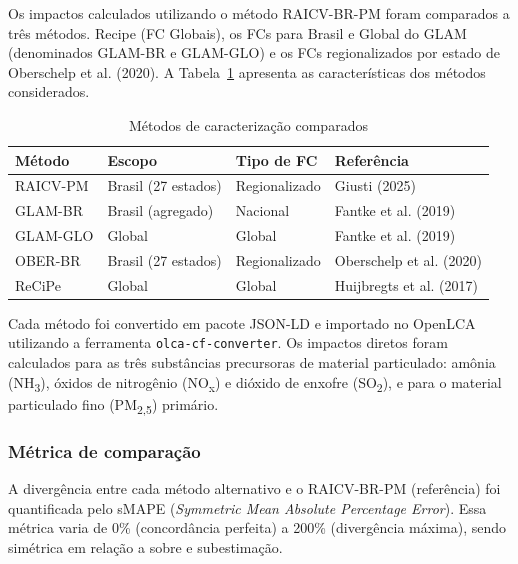 Os impactos calculados utilizando o método RAICV-BR-PM foram comparados a três métodos. Recipe (FC Globais), os FCs para Brasil e Global do GLAM (denominados GLAM-BR e GLAM-GLO) e os FCs regionalizados por estado de Oberschelp et al. (2020). A Tabela~\ref{tab:metodos-comparados} apresenta as características dos métodos considerados.

\begin{table}[H]
\centering
\caption{M\'etodos de caracteriza\c{c}\~ao comparados}
\label{tab:metodos-comparados}
\begin{tabular}{llll}
\toprule
\textbf{M\'etodo} & \textbf{Escopo} & \textbf{Tipo de FC} & \textbf{Refer\^encia} \\
\midrule
RAICV-PM  & Brasil (27 estados) & Regionalizado & Giusti (2025) \\
GLAM-BR   & Brasil (agregado)   & Nacional      & Fantke et al. (2019) \\
GLAM-GLO  & Global              & Global        & Fantke et al. (2019) \\
OBER-BR   & Brasil (27 estados) & Regionalizado & Oberschelp et al. (2020) \\
ReCiPe    & Global              & Global        & Huijbregts et al. (2017) \\
\bottomrule
\end{tabular}
\end{table}

Cada m\'etodo foi convertido em pacote JSON-LD e importado no OpenLCA utilizando a ferramenta \texttt{olca-cf-converter}. Os impactos diretos foram calculados para as três subst\^ancias precursoras de material particulado: am\^onia (NH\textsubscript{3}), \'oxidos de nitrog\^enio (NO\textsubscript{x}) e di\'oxido de enxofre (SO\textsubscript{2}), e para o material particulado fino (PM\textsubscript{2,5}) primário.

\subsubsection{M\'etrica de compara\c{c}\~ao}

A diverg\^encia entre cada m\'etodo alternativo e o RAICV-BR-PM (refer\^encia) foi quantificada pelo sMAPE (\textit{Symmetric Mean Absolute Percentage Error}). Essa m\'etrica varia de 0\% (concord\^ancia perfeita) a 200\% (diverg\^encia m\'axima), sendo sim\'etrica em rela\c{c}\~ao a sobre e subestima\c{c}\~ao.

